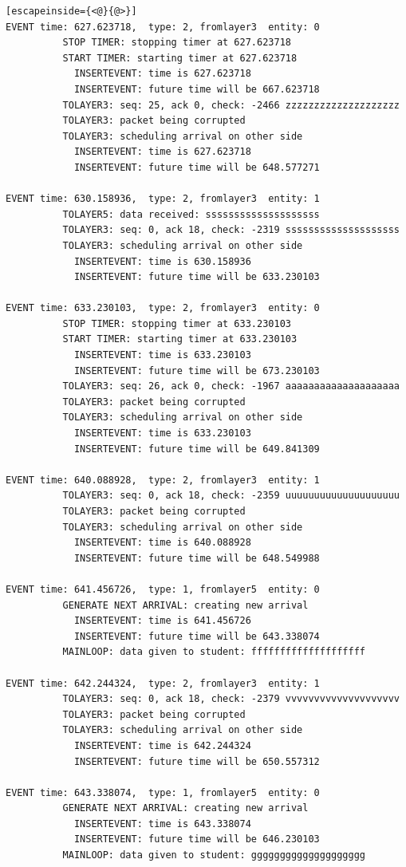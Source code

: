 \documentclass[paper=a4, fontsize=11pt]{scrartcl}
\numberwithin{equation}{section}		%
\numberwithin{figure}{section}			%
\numberwithin{table}{section}				%
\begin{document}
\begin{lstlisting}[escapeinside={<@}{@>}]
EVENT time: 627.623718,  type: 2, fromlayer3  entity: 0
          STOP TIMER: stopping timer at 627.623718
          START TIMER: starting timer at 627.623718
            INSERTEVENT: time is 627.623718
            INSERTEVENT: future time will be 667.623718
          TOLAYER3: seq: 25, ack 0, check: -2466 zzzzzzzzzzzzzzzzzzzz
          TOLAYER3: packet being corrupted
          TOLAYER3: scheduling arrival on other side
            INSERTEVENT: time is 627.623718
            INSERTEVENT: future time will be 648.577271

EVENT time: 630.158936,  type: 2, fromlayer3  entity: 1
          TOLAYER5: data received: ssssssssssssssssssss
          TOLAYER3: seq: 0, ack 18, check: -2319 ssssssssssssssssssss
          TOLAYER3: scheduling arrival on other side
            INSERTEVENT: time is 630.158936
            INSERTEVENT: future time will be 633.230103

EVENT time: 633.230103,  type: 2, fromlayer3  entity: 0
          STOP TIMER: stopping timer at 633.230103
          START TIMER: starting timer at 633.230103
            INSERTEVENT: time is 633.230103
            INSERTEVENT: future time will be 673.230103
          TOLAYER3: seq: 26, ack 0, check: -1967 aaaaaaaaaaaaaaaaaaaa
          TOLAYER3: packet being corrupted
          TOLAYER3: scheduling arrival on other side
            INSERTEVENT: time is 633.230103
            INSERTEVENT: future time will be 649.841309

EVENT time: 640.088928,  type: 2, fromlayer3  entity: 1
          TOLAYER3: seq: 0, ack 18, check: -2359 uuuuuuuuuuuuuuuuuuuu
          TOLAYER3: packet being corrupted
          TOLAYER3: scheduling arrival on other side
            INSERTEVENT: time is 640.088928
            INSERTEVENT: future time will be 648.549988

EVENT time: 641.456726,  type: 1, fromlayer5  entity: 0
          GENERATE NEXT ARRIVAL: creating new arrival
            INSERTEVENT: time is 641.456726
            INSERTEVENT: future time will be 643.338074
          MAINLOOP: data given to student: ffffffffffffffffffff

EVENT time: 642.244324,  type: 2, fromlayer3  entity: 1
          TOLAYER3: seq: 0, ack 18, check: -2379 vvvvvvvvvvvvvvvvvvvv
          TOLAYER3: packet being corrupted
          TOLAYER3: scheduling arrival on other side
            INSERTEVENT: time is 642.244324
            INSERTEVENT: future time will be 650.557312

EVENT time: 643.338074,  type: 1, fromlayer5  entity: 0
          GENERATE NEXT ARRIVAL: creating new arrival
            INSERTEVENT: time is 643.338074
            INSERTEVENT: future time will be 646.230103
          MAINLOOP: data given to student: gggggggggggggggggggg


\end{lstlisting}
\end{document}

